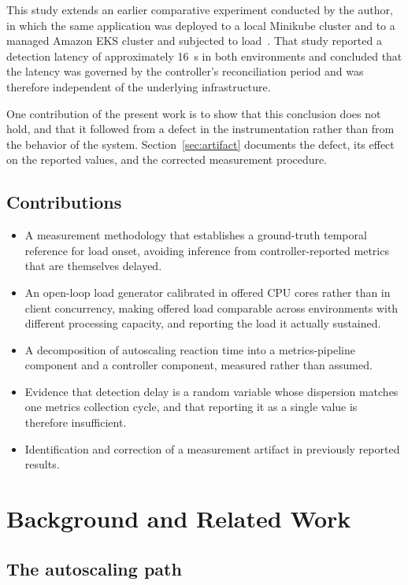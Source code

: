 \documentclass[conference]{IEEEtran}
\begin{document}
This study extends an earlier comparative experiment conducted by the author,
in which the same application was deployed to a local Minikube cluster and to a
managed Amazon EKS cluster and subjected to load~\cite{prev}. That study
reported a detection latency of approximately 16~s in both environments and
concluded that the latency was governed by the controller's reconciliation
period and was therefore independent of the underlying infrastructure.

One contribution of the present work is to show that this conclusion does not
hold, and that it followed from a defect in the instrumentation rather than from
the behavior of the system. Section~\ref{sec:artifact} documents the defect, its
effect on the reported values, and the corrected measurement procedure.

\subsection{Contributions}

\begin{itemize}
\item A measurement methodology that establishes a ground-truth temporal
reference for load onset, avoiding inference from controller-reported metrics
that are themselves delayed.
\item An open-loop load generator calibrated in offered CPU cores rather than
in client concurrency, making offered load comparable across environments with
different processing capacity, and reporting the load it actually sustained.
\item A decomposition of autoscaling reaction time into a metrics-pipeline
component and a controller component, measured rather than assumed.
\item Evidence that detection delay is a random variable whose dispersion
matches one metrics collection cycle, and that reporting it as a single value
is therefore insufficient.
\item Identification and correction of a measurement artifact in previously
reported results.
\end{itemize}

\section{Background and Related Work}

\subsection{The autoscaling path}
\end{document}
